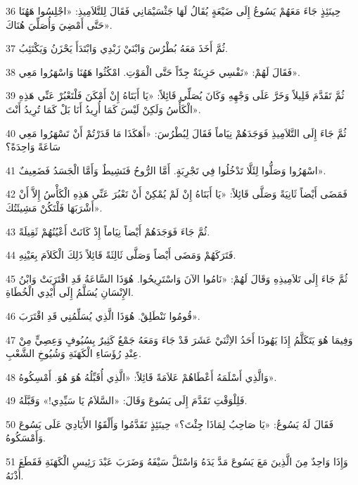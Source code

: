 \par 36 حِينَئِذٍ جَاءَ مَعَهُمْ يَسُوعُ إِلَى ضَيْعَةٍ يُقَالُ لَهَا جَثْسَيْمَانِي فَقَالَ لِلتَّلاَمِيذِ: «اجْلِسُوا هَهُنَا حَتَّى أَمْضِيَ وَأُصَلِّيَ هُنَاكَ».
\par 37 ثُمَّ أَخَذَ مَعَهُ بُطْرُسَ وَابْنَيْ زَبْدِي وَابْتَدَأَ يَحْزَنُ وَيَكْتَئِبُ.
\par 38 فَقَالَ لَهُمْ: «نَفْسِي حَزِينَةٌ جِدّاً حَتَّى الْمَوْتِ. امْكُثُوا هَهُنَا وَاسْهَرُوا مَعِي».
\par 39 ثُمَّ تَقَدَّمَ قَلِيلاً وَخَرَّ عَلَى وَجْهِهِ وَكَانَ يُصَلِّي قَائِلاً: «يَا أَبَتَاهُ إِنْ أَمْكَنَ فَلْتَعْبُرْ عَنِّي هَذِهِ الْكَأْسُ وَلَكِنْ لَيْسَ كَمَا أُرِيدُ أَنَا بَلْ كَمَا تُرِيدُ أَنْتَ».
\par 40 ثُمَّ جَاءَ إِلَى التَّلاَمِيذِ فَوَجَدَهُمْ نِيَاماً فَقَالَ لِبُطْرُسَ: «أَهَكَذَا مَا قَدَرْتُمْ أَنْ تَسْهَرُوا مَعِي سَاعَةً وَاحِدَةً؟
\par 41 اسْهَرُوا وَصَلُّوا لِئَلَّا تَدْخُلُوا فِي تَجْرِبَةٍ. أَمَّا الرُّوحُ فَنَشِيطٌ وَأَمَّا الْجَسَدُ فَضَعِيفٌ».
\par 42 فَمَضَى أَيْضاً ثَانِيَةً وَصَلَّى قَائِلاً: «يَا أَبَتَاهُ إِنْ لَمْ يُمْكِنْ أَنْ تَعْبُرَ عَنِّي هَذِهِ الْكَأْسُ إِلاَّ أَنْ أَشْرَبَهَا فَلْتَكُنْ مَشِيئَتُكَ».
\par 43 ثُمَّ جَاءَ فَوَجَدَهُمْ أَيْضاً نِيَاماً إِذْ كَانَتْ أَعْيُنُهُمْ ثَقِيلَةً.
\par 44 فَتَرَكَهُمْ وَمَضَى أَيْضاً وَصَلَّى ثَالِثَةً قَائِلاً ذَلِكَ الْكَلاَمَ بِعَيْنِهِ.
\par 45 ثُمَّ جَاءَ إِلَى تَلاَمِيذِهِ وَقَالَ لَهُمْ: «نَامُوا الآنَ وَاسْتَرِيحُوا. هُوَذَا السَّاعَةُ قَدِ اقْتَرَبَتْ وَابْنُ الإِنْسَانِ يُسَلَّمُ إِلَى أَيْدِي الْخُطَاةِ.
\par 46 قُومُوا نَنْطَلِقْ. هُوَذَا الَّذِي يُسَلِّمُنِي قَدِ اقْتَرَبَ».
\par 47 وَفِيمَا هُوَ يَتَكَلَّمُ إِذَا يَهُوذَا أَحَدُ الاِثْنَيْ عَشَرَ قَدْ جَاءَ وَمَعَهُ جَمْعٌ كَثِيرٌ بِسُيُوفٍ وَعِصِيٍّ مِنْ عِنْدِ رُؤَسَاءِ الْكَهَنَةِ وَشُيُوخِ الشَّعْبِ.
\par 48 وَالَّذِي أَسْلَمَهُ أَعْطَاهُمْ عَلاَمَةً قَائِلاً: «الَّذِي أُقَبِّلُهُ هُوَ هُوَ. أَمْسِكُوهُ».
\par 49 فَلِلْوَقْتِ تَقَدَّمَ إِلَى يَسُوعَ وَقَالَ: «السَّلاَمُ يَا سَيِّدِي!» وَقَبَّلَهُ.
\par 50 فَقَالَ لَهُ يَسُوعُ: «يَا صَاحِبُ لِمَاذَا جِئْتَ؟» حِينَئِذٍ تَقَدَّمُوا وَأَلْقَوُا الأَيَادِيَ عَلَى يَسُوعَ وَأَمْسَكُوهُ.
\par 51 وَإِذَا وَاحِدٌ مِنَ الَّذِينَ مَعَ يَسُوعَ مَدَّ يَدَهُ وَاسْتَلَّ سَيْفَهُ وَضَرَبَ عَبْدَ رَئِيسِ الْكَهَنَةِ فَقَطَعَ أُذْنَهُ.
